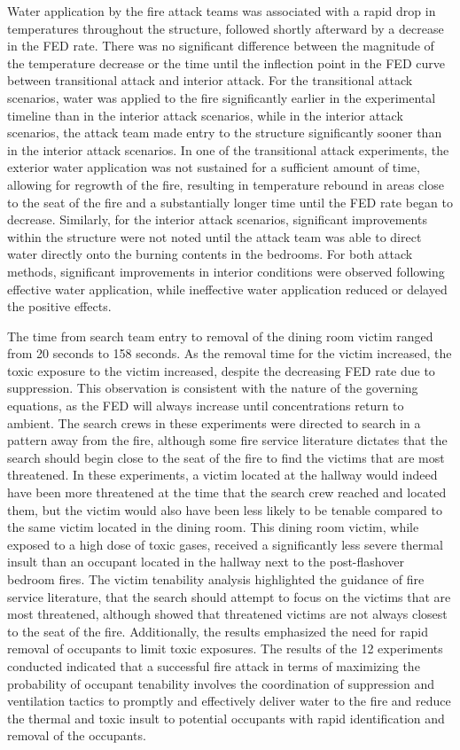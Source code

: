 \documentclass[12pt,oneside]{article}
\begin{document}
Water application by the fire attack teams was associated with a rapid drop in temperatures throughout the structure, followed shortly afterward by a decrease in the FED rate. There was no significant difference between the magnitude of the temperature decrease or the time until the inflection point in the FED curve between transitional attack and interior attack. For the transitional attack scenarios, water was applied to the fire significantly earlier in the experimental timeline than in the interior attack scenarios, while in the interior attack scenarios, the attack team made entry to the structure significantly sooner than in the interior attack scenarios. In one of the transitional attack experiments, the exterior water application was not sustained for a sufficient amount of time, allowing for regrowth of the fire, resulting in temperature rebound in areas close to the seat of the fire and a substantially longer time until the FED rate began to decrease. Similarly, for the interior attack scenarios, significant improvements within the structure were not noted until the attack team was able to direct water directly onto the burning contents in the bedrooms. For both attack methods, significant improvements in  interior conditions were observed following effective water application, while ineffective water application reduced or delayed the positive effects. 

The time from search team entry to removal of the dining room victim ranged from 20 seconds to 158 seconds.  As the removal time for the victim increased, the toxic exposure to the victim increased, despite the decreasing FED rate due to suppression. This observation is consistent with the nature of the governing equations, as the FED will always increase until concentrations return to ambient. The search crews in these experiments were directed to search in a pattern away from the fire, although some fire service literature dictates that the search should begin close to the seat of the fire to find the victims that are most threatened. In these experiments, a victim located at the hallway would indeed have been more threatened at the time that the search crew reached and located them, but the victim would also have been less likely to be tenable compared to the same victim located in the dining room. This dining room victim, while exposed to a high dose of toxic gases, received a significantly less severe thermal insult than an occupant located in the hallway next to the post-flashover bedroom fires. The victim tenability analysis highlighted the guidance of fire service literature, that the search should attempt to focus on the victims that are most threatened, although showed that threatened victims are not always closest to the seat of the fire. Additionally, the results emphasized the need for rapid removal of occupants to limit toxic exposures. The results of the 12 experiments conducted indicated that a successful fire attack in terms of maximizing the probability of occupant tenability involves the coordination of suppression  and ventilation tactics to promptly and effectively deliver water to the fire and reduce the thermal and toxic insult to potential occupants with rapid identification and removal of the occupants. 
\end{document}
